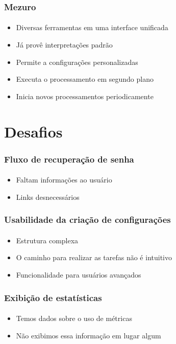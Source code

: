 \documentclass{beamer}
\begin{document}
\begin{frame}
  \frametitle{Mezuro}
  \framesubtitle{}

  \begin{itemize}
    \item Diversas ferramentas em uma interface unificada
      \vspace{.25cm}
    \item Já provê interpretações padrão
      \vspace{.25cm}
    \item Permite a configurações personalizadas
      \vspace{.25cm}
    \item Executa o processamento em segundo plano
      \vspace{.25cm}
    \item Inicia novos processamentos periodicamente
  \end{itemize}
\end{frame}

\section{Desafios}
\begin{frame}
  \frametitle{Fluxo de recuperação de senha}
  \framesubtitle{}

  \begin{itemize}
    \item Faltam informações ao usuário
      \vspace{.5cm}
    \item Links desnecessários
  \end{itemize}
\end{frame}

\begin{frame}
  \frametitle{Usabilidade da criação de configurações}
  \framesubtitle{}

  \begin{itemize}
    \item Estrutura complexa
      \vspace{.5cm}
    \item O caminho para realizar as tarefas não é intuitivo
      \vspace{.5cm}
    \item Funcionalidade para usuários avançados
  \end{itemize}
\end{frame}

\begin{frame}
  \frametitle{Exibição de estatísticas}
  \framesubtitle{}

  \begin{itemize}
    \item Temos dados sobre o uso de métricas
      \vspace{.5cm}
    \item Não exibimos essa informação em lugar algum
  \end{itemize}
\end{frame}
\end{document}
